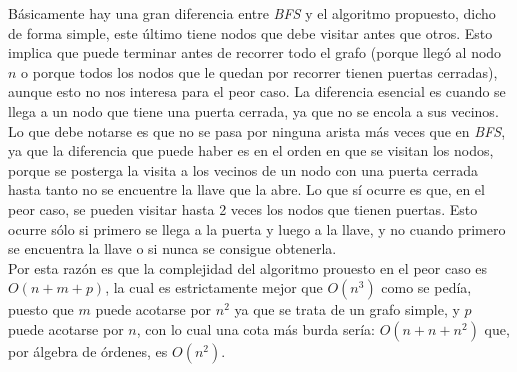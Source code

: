 Básicamente hay una gran diferencia entre \textit{BFS} y el algoritmo propuesto, dicho de forma simple, este último tiene nodos que debe visitar antes que otros. Esto implica que puede terminar antes de recorrer todo el grafo (porque llegó al nodo $n$ o porque todos los nodos que le quedan por recorrer tienen puertas cerradas), aunque esto no nos interesa para el peor caso. La diferencia esencial es cuando se llega a un nodo que tiene una puerta cerrada, ya que no se encola a sus vecinos. Lo que debe notarse es que no se pasa por ninguna arista más veces que en \textit{BFS}, ya que la diferencia que puede haber es en el orden en que se visitan los nodos, porque se posterga la visita a los vecinos de un nodo con una puerta cerrada hasta tanto no se encuentre la llave que la abre. Lo que sí ocurre es que, en el peor caso, se pueden visitar hasta 2 veces los nodos que tienen puertas. Esto ocurre sólo si primero se llega a la puerta y luego a la llave, y no cuando primero se encuentra la llave o si nunca se consigue obtenerla. \\

Por esta razón es que la complejidad del algoritmo prouesto en el peor caso es $O(n+m+p)$, la cual es estrictamente mejor que $O(n^3)$ como se pedía, puesto que $m$ puede acotarse por $n^2$ ya que se trata de un grafo simple, y $p$ puede acotarse por $n$, con lo cual una cota más burda sería: $O(n+n+n^2)$ que, por álgebra de órdenes, es $O(n^2)$. \\
